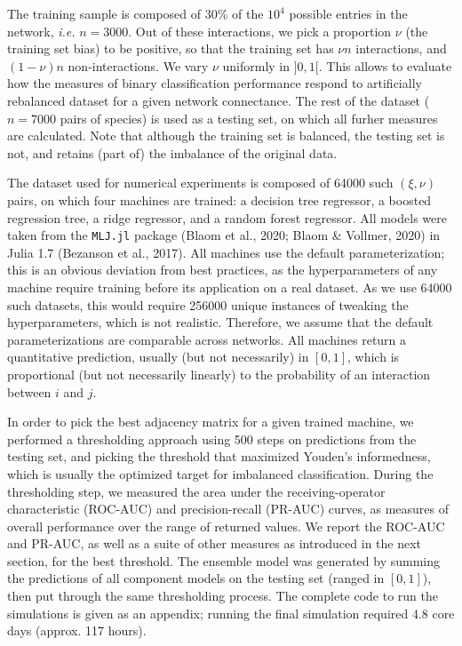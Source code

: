 \documentclass[11pt]{article}
\begin{document}
The training sample is composed of 30\% of the \(10^4\) possible entries
in the network, \emph{i.e.} \(n=3000\). Out of these interactions, we
pick a proportion \(\nu\) (the training set bias) to be positive, so
that the training set has \(\nu n\) interactions, and \((1-\nu) n\)
non-interactions. We vary \(\nu\) uniformly in \(]0,1[\). This allows to
evaluate how the measures of binary classification performance respond
to artificially rebalanced dataset for a given network connectance. The
rest of the dataset (\(n=7000\) pairs of species) is used as a testing
set, on which all furher measures are calculated. Note that although the
training set is balanced, the testing set is not, and retains (part of)
the imbalance of the original data.

The dataset used for numerical experiments is composed of 64000 such
\((\xi, \nu)\) pairs, on which four machines are trained: a decision
tree regressor, a boosted regression tree, a ridge regressor, and a
random forest regressor. All models were taken from the \texttt{MLJ.jl}
package (Blaom et al., 2020; Blaom \& Vollmer, 2020) in Julia 1.7
(Bezanson et al., 2017). All machines use the default parameterization;
this is an obvious deviation from best practices, as the hyperparameters
of any machine require training before its application on a real
dataset. As we use 64000 such datasets, this would require 256000 unique
instances of tweaking the hyperparameters, which is not realistic.
Therefore, we assume that the default parameterizations are comparable
across networks. All machines return a quantitative prediction, usually
(but not necessarily) in \([0,1]\), which is proportional (but not
necessarily linearly) to the probability of an interaction between \(i\)
and \(j\).

In order to pick the best adjacency matrix for a given trained machine,
we performed a thresholding approach using 500 steps on predictions from
the testing set, and picking the threshold that maximized Youden's
informedness, which is usually the optimized target for imbalanced
classification. During the thresholding step, we measured the area under
the receiving-operator characteristic (ROC-AUC) and precision-recall
(PR-AUC) curves, as measures of overall performance over the range of
returned values. We report the ROC-AUC and PR-AUC, as well as a suite of
other measures as introduced in the next section, for the best
threshold. The ensemble model was generated by summing the predictions
of all component models on the testing set (ranged in \([0,1]\)), then
put through the same thresholding process. The complete code to run the
simulations is given as an appendix; running the final simulation
required 4.8 core days (approx. 117 hours).
\end{document}
